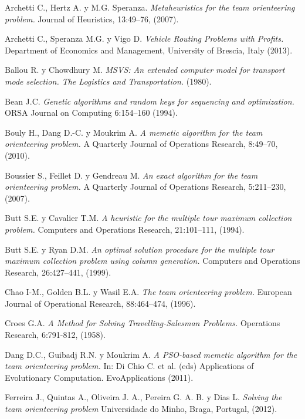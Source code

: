 \renewcommand\bibname{References}
\begin{thebibliography}{9}

Archetti C., Hertz A. y M.G. Speranza.
\textit{Metaheuristics for the team orienteering problem.} 
Journal of Heuristics, 13:49–76, (2007).

Archetti C., Speranza M.G. y Vigo D.
\textit{Vehicle Routing Problems with Profits.} 
Department of Economics and Management, University of Brescia, Italy (2013).

Ballou R. y Chowdhury M.
\textit{MSVS: An extended computer model for transport mode selection. The Logistics and Transportation.}
(1980).

Bean J.C.
\textit{Genetic algorithms and random keys for sequencing and optimization.}
ORSA Journal on Computing 6:154–160 (1994).

Bouly H., Dang D.-C. y Moukrim A.
\textit{A memetic algorithm for the team orienteering problem.}
A Quarterly Journal of Operations Research, 8:49–70, (2010).

Boussier S., Feillet D. y Gendreau M.
\textit{An exact algorithm for the team orienteering problem.}
A Quarterly Journal of Operations Research, 5:211–230, (2007).

Butt S.E. y Cavalier T.M.
\textit{A heuristic for the multiple tour maximum collection problem.}
Computers and Operations Research, 21:101–111, (1994).

Butt S.E. y Ryan D.M. 
\textit{An optimal solution procedure for the multiple tour maximum collection problem using column generation.}
Computers and Operations Research, 26:427–441, (1999).

Chao I-M., Golden B.L. y Wasil E.A.
\textit{The team orienteering problem.}
European Journal of Operational Research, 88:464–474, (1996).

Croes G.A.
\textit{A Method for Solving Travelling-Salesman Problems.}
Operations Research, 6:791-812, (1958).

Dang D.C., Guibadj R.N. y Moukrim A.
\textit{A PSO-based memetic algorithm for the team orienteering problem.}
In: Di Chio C. et al. (eds) Applications of Evolutionary Computation. EvoApplications (2011).

Ferreira J., Quintas A., Oliveira J. A., Pereira G. A. B. y Dias L.
\textit{Solving the team orienteering problem}
Universidade do Minho, Braga, Portugal, (2012).


\end{thebibliography}
